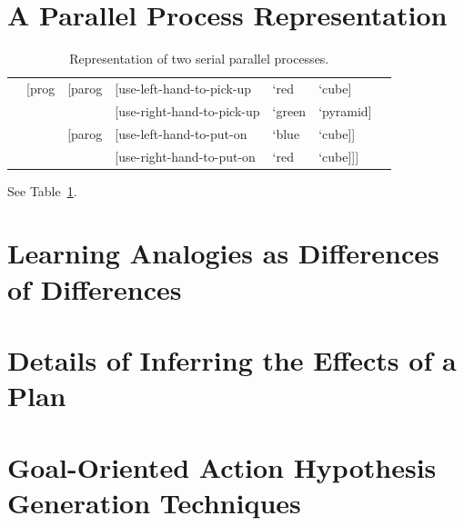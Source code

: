 \section{A Parallel Process Representation}
\label{sec:parallel_process_representation}

\begin{table}
  \myfloatalign
  \begin{tabularx}{\textwidth}{XlllllX}
    & [prog & [parog & [use-left-hand-to-pick-up  & `red   & `cube]    & \\
    &       &        & [use-right-hand-to-pick-up & `green & `pyramid] & \\
    &       & [parog & [use-left-hand-to-put-on   & `blue  & `cube]]   & \\
    &       &        & [use-right-hand-to-put-on  & `red   & `cube]]]  & \\
  \end{tabularx}
  \caption[Representation of two serial parallel processes]{Representation of two serial parallel processes.}
  \label{tab:parallel_process_representation}
\end{table}

See Table~\ref{tab:parallel_process_representation}.


\section{Learning Analogies as Differences of Differences}
\label{sec:learning_analogies_as_differences_of_differences}


\section{Details of Inferring the Effects of a Plan}
\label{sec:details_of_inferring_the_effects_of_a_plan}



\section{Goal-Oriented Action Hypothesis Generation Techniques}
\label{sec:goal_oriented_action_hypotheses_generation_techniques}
